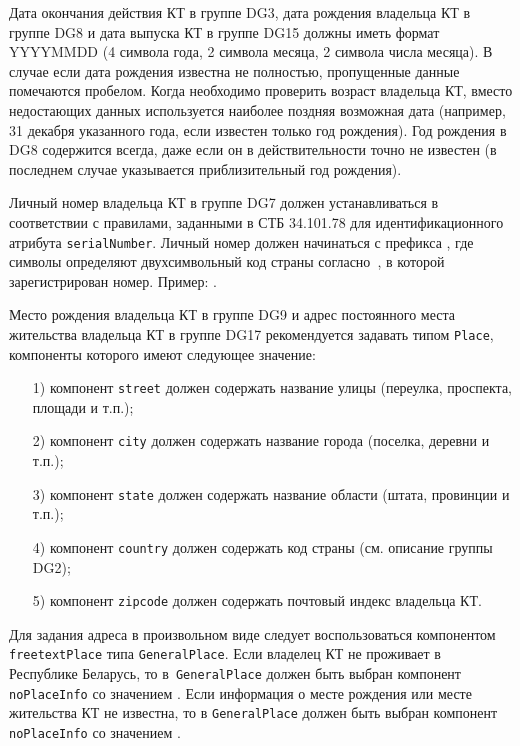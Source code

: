 Дата окончания действия КТ в группе DG3, дата рождения владельца КТ в группе DG8 
и дата выпуска КТ в группе DG15 должны иметь формат YYYYMMDD 
(4 символа года, 2 символа месяца, 2 символа 
числа месяца). В случае если дата рождения известна не полностью, 
пропущенные данные помечаются пробелом. Когда необходимо проверить 
возраст владельца КТ, вместо недостающих данных используется наиболее 
поздняя возможная дата (например, 31 декабря указанного года, если 
известен только год рождения). Год рождения в DG8 содержится всегда, даже 
если он в действительности точно не известен (в последнем случае 
указывается приблизительный год рождения). 

Личный номер владельца КТ в группе DG7 должен устанавливаться в соответствии с
правилами, заданными в СТБ 34.101.78 для идентификационного атрибута
\verb|serialNumber|. Личный номер должен начинаться с префикса
, где символы  определяют двухсимвольный код страны
согласно~\cite{CountryCodes}, в которой зарегистрирован номер.
Пример: .

Место рождения владельца КТ в группе DG9 и адрес постоянного места жительства
владельца КТ в группе DG17 рекомендуется задавать типом \verb|Place|, 
компоненты которого имеют следующее значение: 
\begin{enumerate}
\item[1)]
компонент \verb|street| должен содержать название улицы (переулка, 
проспекта, площади и т.п.); 
\item[2)]
компонент \verb|city| должен содержать название города (поселка, деревни и т.п.); 
\item[3)]
компонент \verb|state| должен содержать название области (штата, провинции и т.п.);
\item[4)]
компонент \verb|country| должен содержать код страны (см. описание группы DG2);
\item[5)]
компонент \verb|zipcode| должен содержать почтовый индекс владельца КТ.
\end{enumerate}

Для задания адреса в произвольном виде следует воспользоваться компонентом 
\verb|freetextPlace| типа \verb|GeneralPlace|. Если владелец КТ не проживает в 
Республике Беларусь, то в~\verb|GeneralPlace| должен быть выбран компонент 
\verb|noPlaceInfo| со значением . 
Если информация о месте рождения или месте жительства 
КТ не известна, то в \verb|GeneralPlace| 
должен быть выбран компонент \verb|noPlaceInfo| со значением 
. 

